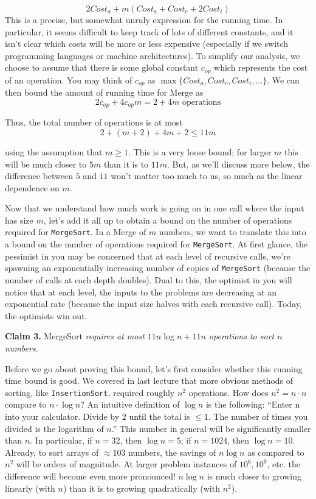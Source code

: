 \documentclass [12pt]{article}
\begin{document}
\begin{enumerate}
    $$
        2Cost_a + m(Cost_a + Cost_c + 2Cost_i)
    $$
    This is a precise, but somewhat unruly expression for the running time. In particular, it seems difficult to keep track of lots of different constants, and it isn't clear which costs will be more or less expensive (especially if we switch programming languages or machine architectures). To simplify our analysis, we choose to assume that there is some global constant $c_{op}$ which represents the cost of an operation. You may think of $c_{op}$ as $\max\{Cost_a, Cost_c , Cost_i, \dots\}$. We can then bound the amount of running time for Merge as
    $$
    2c_{op} + 4c_{op}m = 2 + 4m \text{ operations}
    $$
\end{enumerate}

Thus, the total number of operations is at most
$$
2 + (m+2) + 4m + 2 \leq 11m
$$

using the assumption that $m \geq 1$. This is a very loose bound; for larger $m$ this will be much closer to $5m$ than it is to $11m$. But, as we'll discuss more below, the difference between $5$ and $11$ won't matter too much to us, so much as the linear dependence on $m$.

Now that we understand how much work is going on in one call where the input has size $m$, let's add it all up to obtain a bound on the number of operations required for \texttt{MergeSort}. In a Merge of $m$ numbers, we want to translate this into a bound on the number of operations required for \texttt{MergeSort}. At first glance, the pessimist in you may be concerned that at each level of recursive calls, we're spawning an exponentially increasing number of copies of
\texttt{MergeSort} (because the number of calls at each depth doubles). Dual to this, the optimist in you will notice that at each level, the inputs to the problems are decreasing at an exponential rate (because the input size halves with each recursive call). Today, the optimists win out.

\textbf{Claim 3.} MergeSort \textit{requires at most $11n \log n + 11n$ operations to sort $n$ numbers}.

Before we go about proving this bound, let’s first consider whether this running time bound is good. We covered in last lecture that more obvious methods of sorting, like \texttt{InsertionSort}, required roughly $n^2$ operations. How does $n^2 = n \cdot n$ compare to $n \cdot \log n$? An intuitive definition of $\log n$ is the following: ``Enter n into your calculator. Divide by $2$ until the total is $\leq 1$. The number of times you divided is the logarithm of $n$.'' This number in general will be significantly smaller than $n$. In particular, if $n = 32$, then $\log n = 5$; if $n = 1024$, then $\log n = 10$. Already, to sort arrays of $\approx 103$ numbers, the savings of $n \log n$ as compared to $n^2$ will be orders of magnitude. At larger problem instances of $10^6, 10^9$, etc. the difference will become even more pronounced! $n \log n$ is much closer to growing linearly (with $n$) than it is to growing quadratically (with $n^2$).
\end{document}
